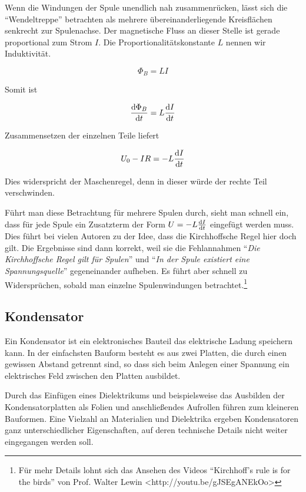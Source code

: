 Wenn die Windungen der Spule unendlich nah zusammenrücken, lässt sich die
``Wendeltreppe'' betrachten als mehrere übereinanderliegende Kreisflächen
senkrecht zur Spulenachse. Der magnetische Fluss an dieser Stelle ist gerade
proportional zum Strom $I$. Die Proportionalitätskonstante $L$ nennen wir
Induktivität.

\begin{equation}
  \Phi_B = L I
\end{equation}

Somit ist

\begin{equation}
  \frac{\dif \Phi_B}{\dif t} = L \frac{\dif I}{\dif t}
\end{equation}

Zusammensetzen der einzelnen Teile liefert

\begin{equation}
  U_0 - IR = -L \frac{\dif I}{\dif t}
  \label{eq:ind}
\end{equation}

Dies widerspricht der Maschenregel, denn in dieser würde der rechte Teil
verschwinden.

Führt man diese Betrachtung für mehrere Spulen durch, sieht man schnell ein,
dass für jede Spule ein Zusatzterm der Form $U = -L \frac{\dif I}{\dif t}$
eingefügt werden muss. Dies führt bei vielen Autoren zu der Idee, dass die
Kirchhoffsche Regel hier doch gilt. Die Ergebnisse sind dann korrekt, weil sie
die Fehlannahmen ``\textit{Die Kirchhoffsche Regel gilt für Spulen}'' und
``\textit{In der Spule existiert eine Spannungsquelle}'' gegeneinander
aufheben. Es führt aber schnell zu Widersprüchen, sobald man einzelne
Spulenwindungen betrachtet.\footnote{Für mehr Details lohnt sich das Ansehen
des Videos ``Kirchhoff's rule is for the birds'' von Prof. Walter Lewin
<http://youtu.be/gJSEgANEkOo>}


\subsection{Kondensator}


Ein Kondensator ist ein elektronisches Bauteil das elektrische Ladung speichern
kann. In der einfachsten Bauform besteht es aus zwei Platten, die durch einen
gewissen Abstand getrennt sind, so dass sich beim Anlegen einer Spannung ein
elektrisches Feld zwischen den Platten ausbildet.

Durch das Einfügen eines Dielektrikums und beispielsweise das Ausbilden der
Kondensatorplatten als Folien und anschließendes Aufrollen führen zum kleineren
Bauformen. Eine Vielzahl an Materialien und Dielektrika ergeben Kondensatoren
ganz unterschiedlicher Eigenschaften, auf deren technische Details nicht weiter
eingegangen werden soll.

